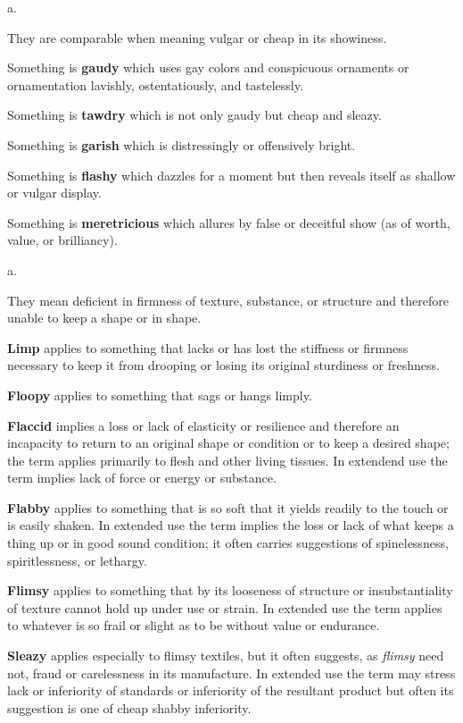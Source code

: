 \begin{description}[style=unboxed]
 a.
\begin{mynewitemize}
\item They are comparable when meaning vulgar or cheap in its showiness.
\item Something is \textbf{gaudy} which uses gay colors and conspicuous
ornaments or ornamentation lavishly, ostentatiously, and tastelessly.
\item Something is \textbf{tawdry} which is not only gaudy but cheap and sleazy.
\item Something is \textbf{garish} which is distressingly or offensively bright.
\item Something is \textbf{flashy} which dazzles for a moment but then reveals 
itself as shallow or vulgar display.
\item Something is \textbf{meretricious} which allures by false or deceitful
show (as of worth, value, or brilliancy).
\end{mynewitemize}

 a.
\begin{mynewitemize}
\item They mean deficient in firmness of texture, substance, or structure
and therefore unable to keep a shape or in shape.
\item \textbf{Limp} applies to something that lacks or has lost the stiffness
or firmness necessary to keep it from drooping or losing its original
sturdiness or freshness.
\item \textbf{Floopy} applies to something that sags or hangs limply.
\item \textbf{Flaccid} implies a loss or lack of elasticity or resilience and
therefore an incapacity to return to an original shape or condition or to 
keep a desired shape; the term applies primarily to flesh and other living tissues.
In extendend use the term implies lack of force or energy or substance.
\item \textbf{Flabby} applies to something that is so soft that it yields
readily to the touch or is easily shaken. In extended use the term implies
the loss or lack of what keeps a thing up or in good sound condition; it
often carries suggestions of spinelessness, spiritlessness, or lethargy.
\item \textbf{Flimsy} applies to something that by its looseness of structure
or insubstantiality of texture cannot hold up under use or strain. In extended
use the term applies to whatever is so frail or slight as to be without 
value or endurance.
\item \textbf{Sleazy} applies especially to flimsy textiles, but it often
suggests, as \textit{flimsy} need not, fraud or carelessness in its manufacture.
In extended use the term may stress lack or inferiority of standards or inferiority
of the resultant product but often its suggestion is one of cheap shabby inferiority.
\end{mynewitemize}


\end{description}
